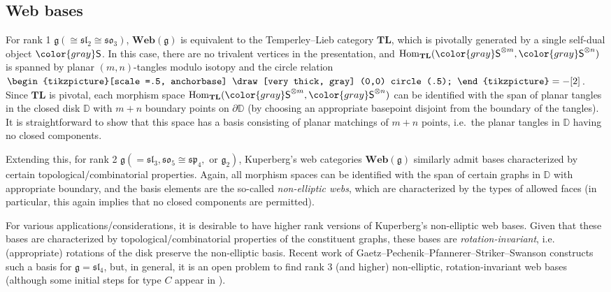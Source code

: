 \documentclass[10pt]{amsart}
\newcommand{\gray}[1]{{\color{gray}#1}}
\numberwithin{equation}{section}
\theoremstyle{definition}
\newcommand{\Hom}{{\rm Hom}}
\newcommand{\TL}{{\mathbf{TL}}}
\newcommand{\sln}[1][n]{\mathfrak{sl}_{#1}}
\newcommand{\spn}[1][2n]{\mathfrak{sp}_{#1}}
\newcommand{\son}[1][2n+1]{\mathfrak{so}_{#1}}
\newcommand{\Web}{\mathbf{Web}}
\newcommand{\gS}{\gray{\mathsf{S}}}
\begin{document}
\subsection{Web bases}
	\label{ss:webbasesintro}

For rank 1 $\mathfrak{g} (\cong \sln[2] \cong \son[3])$, 
$\Web(\mathfrak{g})$ is equivalent to the Temperley--Lieb category $\TL$,
which is pivotally generated by a single self-dual object $\gS$. 
In this case, there are no trivalent vertices in the presentation, 
and $\Hom_{\TL}(\gS^{\otimes m} , \gS^{\otimes n})$ is spanned by planar $(m,n)$-tangles 
modulo isotopy and the circle relation 
$\begin{tikzpicture}[scale =.5, anchorbase]
	\draw[very thick, gray] (0,0) circle (.5);
\end{tikzpicture} = - [2]$.
Since $\TL$ is pivotal, each morphism space $\Hom_{\TL}(\gS^{\otimes m} , \gS^{\otimes n})$ 
can be identified with the span of planar tangles in the closed disk $\mathbb{D}$ 
with $m+n$ boundary points on $\partial \mathbb{D}$ 
(by choosing an appropriate basepoint disjoint from the boundary of the tangles).
It is straightforward to show that this space has a basis consisting of planar matchings of 
$m+n$ points, i.e.~the planar tangles in $\mathbb{D}$ having no closed components.

Extending this, for rank 2 $\mathfrak{g} (= \sln[3], \son[5] \cong \spn[4], \text{ or } \mathfrak{g}_2)$, 
Kuperberg's web categories $\Web(\mathfrak{g})$ similarly admit bases characterized by certain 
topological/combinatorial properties. 
Again, all morphism spaces can be identified with the span of certain graphs in $\mathbb{D}$ 
with appropriate boundary, and the basis elements are the so-called \emph{non-elliptic webs}, 
which are characterized by the types of allowed faces 
(in particular, this again implies that no closed components are permitted).

For various applications/considerations, 
it is desirable to have higher rank versions of Kuperberg's non-elliptic web bases. 
Given that these bases are characterized by topological/combinatorial properties of the constituent graphs, 
these bases are \emph{rotation-invariant}, 
i.e.~ (appropriate) rotations of the disk preserve the non-elliptic basis.
Recent work of Gaetz--Pechenik--Pfannerer--Striker--Swanson \cite[Theorem A]{MR5008156}
constructs such a basis for $\mathfrak{g}=\mathfrak{sl}_4$, 
but, in general, it is an open problem to find rank $3$ (and higher) non-elliptic, rotation-invariant web bases
(although some initial steps for type $C$ appear in \cite{BERT}).
\end{document}
